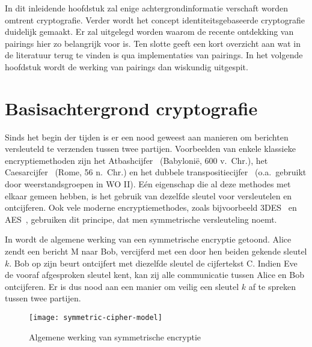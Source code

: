 
 In dit inleidende hoofdstuk zal enige achtergrondinformatie verschaft worden omtrent cryptografie. Verder wordt het concept identiteitsgebaseerde cryptografie duidelijk gemaakt. Er zal uitgelegd worden waarom de recente ontdekking van pairings hier zo belangrijk voor is. Ten slotte geeft een kort overzicht aan wat in de literatuur terug te vinden is qua implementaties van pairings. In het volgende hoofdstuk wordt de werking van pairings dan wiskundig uitgespit.

\section{Basisachtergrond cryptografie}

Sinds het begin der tijden is er een nood geweest aan manieren om berichten versleuteld te verzenden tussen twee partijen. Voorbeelden van enkele klassieke encryptiemethoden zijn het Atbashcijfer~\cite{athbash} (Babyloni\"e, 600 v.\ Chr.), het Caesarcijfer~\cite{caesar} (Rome, 56 n.\ Chr.) en het dubbele transpositiecijfer~\cite{kahn} (o.a.\ gebruikt door weerstandsgroepen in WO II). E\'en eigenschap die al deze methodes met elkaar gemeen hebben, is het gebruik van dezelfde sleutel voor versleutelen en ontcijferen. Ook vele moderne encryptiemethodes, zoals bijvoorbeeld 3DES~\cite{3des} en AES~\cite{aes}, gebruiken dit principe, dat men symmetrische versleuteling noemt.

In  wordt de algemene werking van een symmetrische encryptie getoond. Alice zendt een bericht M naar Bob, vercijferd met een door hen beiden gekende sleutel $k$. Bob op zijn beurt ontcijfert met diezelfde sleutel de cijfertekst C. Indien Eve de vooraf afgesproken sleutel kent, kan zij alle communicatie tussen Alice en Bob ontcijferen. Er is dus nood aan een manier om veilig een sleutel $k$ af te spreken tussen twee partijen.

\begin{figure}[h]
	\centering
		\texttt{[image: symmetric-cipher-model]}
		\caption{Algemene werking van symmetrische encryptie\label{fig-encryptie-applicaties-sym-cipher}}
\end{figure}

